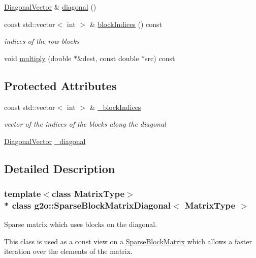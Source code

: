 \begin{DoxyCompactItemize}
\hyperlink{classg2o_1_1SparseBlockMatrixDiagonal_a2eb7fc4130fac5c499b57f3bec855812}{Diagonal\+Vector} \& \hyperlink{classg2o_1_1SparseBlockMatrixDiagonal_af75593896065195f7dc2342132c565cc}{diagonal} ()
\item 
const std\+::vector$<$ int $>$ \& \hyperlink{classg2o_1_1SparseBlockMatrixDiagonal_acac6778f21aea2355fccad48de1c6f08}{block\+Indices} () const 
\begin{DoxyCompactList}\small\item\em indices of the row blocks \end{DoxyCompactList}\item 
void \hyperlink{classg2o_1_1SparseBlockMatrixDiagonal_a3b6da3a28659e6b86410885ce7297ce2}{multiply} (double $\ast$\&dest, const double $\ast$src) const 
\end{DoxyCompactItemize}
\subsection*{Protected Attributes}
\begin{DoxyCompactItemize}
\item 
const std\+::vector$<$ int $>$ \& \hyperlink{classg2o_1_1SparseBlockMatrixDiagonal_a12ca3362997c3ca21c8b2a203177485e}{\+\_\+block\+Indices}
\begin{DoxyCompactList}\small\item\em vector of the indices of the blocks along the diagonal \end{DoxyCompactList}\item 
\hyperlink{classg2o_1_1SparseBlockMatrixDiagonal_a2eb7fc4130fac5c499b57f3bec855812}{Diagonal\+Vector} \hyperlink{classg2o_1_1SparseBlockMatrixDiagonal_a0679df785f9e7b79a1e9dfe623af5341}{\+\_\+diagonal}
\end{DoxyCompactItemize}


\subsection{Detailed Description}
\subsubsection*{template$<$class Matrix\+Type$>$\\*
class g2o\+::\+Sparse\+Block\+Matrix\+Diagonal$<$ Matrix\+Type $>$}

Sparse matrix which uses blocks on the diagonal. 

This class is used as a const view on a \hyperlink{classg2o_1_1SparseBlockMatrix}{Sparse\+Block\+Matrix} which allows a faster iteration over the elements of the matrix. 

